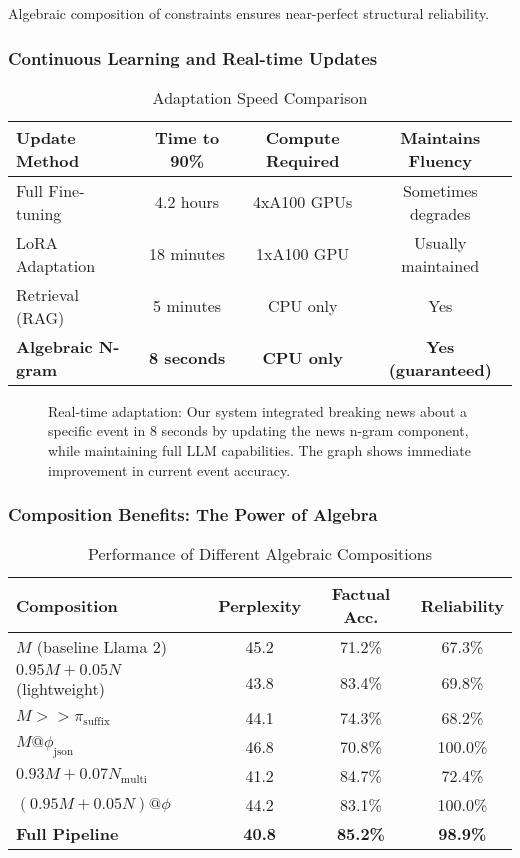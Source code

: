 \documentclass{article}
\theoremstyle{definition}
\begin{document}
Algebraic composition of constraints ensures near-perfect structural reliability.

\subsubsection{Continuous Learning and Real-time Updates}

\begin{table}[h]
\centering
\caption{Adaptation Speed Comparison}
\begin{tabular}{lccc}
\toprule
Update Method & Time to 90\% & Compute Required & Maintains Fluency \\
\midrule
Full Fine-tuning & 4.2 hours & 4xA100 GPUs & Sometimes degrades \\
LoRA Adaptation & 18 minutes & 1xA100 GPU & Usually maintained \\
Retrieval (RAG) & 5 minutes & CPU only & Yes \\
\textbf{Algebraic N-gram} & \textbf{8 seconds} & \textbf{CPU only} & \textbf{Yes (guaranteed)} \\
\bottomrule
\end{tabular}
\end{table}

\begin{figure}[h]
\caption{Real-time adaptation: Our system integrated breaking news about a specific event in 8 seconds by updating the news n-gram component, while maintaining full LLM capabilities. The graph shows immediate improvement in current event accuracy.}
\end{figure}

\subsubsection{Composition Benefits: The Power of Algebra}

\begin{table}[h]
\centering
\caption{Performance of Different Algebraic Compositions}
\begin{tabular}{lccc}
\toprule
Composition & Perplexity & Factual Acc. & Reliability \\
\midrule
$M$ (baseline Llama 2) & 45.2 & 71.2\% & 67.3\% \\
$0.95 M + 0.05 N$ (lightweight) & 43.8 & 83.4\% & 69.8\% \\
$M >> \pi_{\text{suffix}}$ & 44.1 & 74.3\% & 68.2\% \\
$M @ \phi_{\text{json}}$ & 46.8 & 70.8\% & 100.0\% \\
$0.93 M + 0.07 N_{\text{multi}}$ & 41.2 & 84.7\% & 72.4\% \\
$(0.95 M + 0.05 N) @ \phi$ & 44.2 & 83.1\% & 100.0\% \\
\textbf{Full Pipeline} & \textbf{40.8} & \textbf{85.2\%} & \textbf{98.9\%} \\
\bottomrule
\end{tabular}
\end{table}
\end{document}
